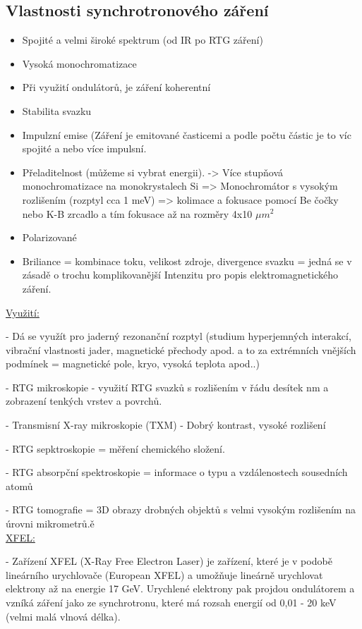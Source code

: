 \subsection{Vlastnosti synchrotronového záření}

\begin{itemize}
    \item Spojité a velmi široké spektrum (od IR po RTG záření)
    \item Vysoká monochromatizace
    \item Při využití ondulátorů, je záření koherentní
    \item Stabilita svazku
    \item Impulzní emise (Záření je emitované časticemi a podle počtu částic je to víc spojité a nebo více impulsní.
    \item Přeladitelnost (můžeme si vybrat energii). -> Více stupňová monochromatizace na monokrystalech Si => Monochromátor s vysokým rozlišením (rozptyl cca 1 meV) => kolimace a fokusace pomocí Be čočky nebo K-B zrcadlo a tím fokusace až na rozměry 4x10 $\mu m^2$
    \item Polarizované
    \item Briliance = kombinace toku, velikost zdroje, divergence svazku = jedná se v zásadě o trochu komplikovanější Intenzitu pro popis elektromagnetického záření. 
\end{itemize}


\underline{Využití:}

- Dá se využít pro jaderný rezonanční rozptyl (studium hyperjemných interakcí, vibrační vlastnosti jader, magnetické přechody apod. a to za extrémních vnějších podmínek = magnetické pole, kryo, vysoká teplota apod..)

- RTG mikroskopie - využití RTG svazků s rozlišením v řádu desítek nm a zobrazení tenkých vrstev a povrchů.

- Transmisní X-ray mikroskopie (TXM) - Dobrý kontrast, vysoké rozlišení

- RTG sepktroskopie = měření chemického složení.

- RTG absorpční spektroskopie = informace o typu a vzdálenostech sousedních atomů

- RTG tomografie = 3D obrazy drobných objektů s velmi vysokým rozlišením na úrovni mikrometrů.ě
\\

\underline{XFEL:} 

- Zařízení XFEL (X-Ray Free Electron Laser) je zařízení, které je v podobě lineárního urychlovače (European XFEL) a umožňuje lineárně urychlovat elektrony až na energie 17 GeV. Urychlené elektrony pak projdou ondulátorem a vzníká záření jako ze synchrotronu, které má rozsah energií od 0,01 - 20 keV (velmi malá vlnová délka).

